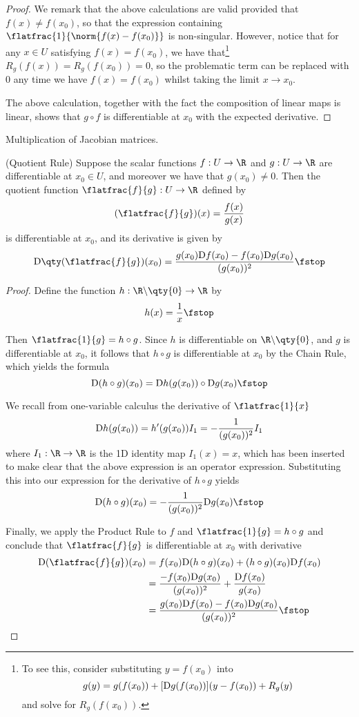 \begin{proof}
  We remark that the above calculations are valid provided that \( f(x)\neq f(x_0) \), so that the expression containing \( \flatfrac{1}{\norm{f(x)-f(x_0)}} \) is non-singular. However, notice that for any \( x\in U \) satisfying \( f(x)=f(x_0) \), we have that\footnote{To see this, consider substituting \( y=f(x_0) \) into \[ g(y)=g(f(x_0))+[\text{D} g(f(x_0))](y-f(x_0))+R_g(y) \] and solve for \( R_g(f(x_0)) \).} \( R_g(f(x))=R_g(f(x_0))=0 \), so the problematic term can be replaced with 0 any time we have \( f(x)=f(x_0) \) whilst taking the limit \( x\to x_0 \).

  \vspace{3mm}

  The above calculation, together with the fact the composition of linear maps is linear, shows that \( g\circ f \) is differentiable at \( x_0 \) with the expected derivative.
\end{proof}

Multiplication of Jacobian matrices.

\begin{theorem}
  (Quotient Rule) Suppose the scalar functions \( f:U\to\R \) and \( g:U\to\R \) are differentiable at \( x_0\in U \), and moreover we have that \( g(x_0)\neq 0 \). Then the quotient function \( \flatfrac{f}{g}:U\to\R \) defined by
  \[ (\flatfrac{f}{g})(x)=\frac{f(x)}{g(x)} \]
  is differentiable at \( x_0 \), and its derivative is given by
  \[ \D\qty(\flatfrac{f}{g})(x_0)=\frac{g(x_0)\D f(x_0)-f(x_0)\D g(x_0)}{(g(x_0))^2}\fstop \]
\end{theorem}
\begin{proof}
  Define the function \( h:\R\backslash\qty{0}\to\R \) by
  \[ h(x)=\frac{1}{x}\fstop \]

  Then \( \flatfrac{1}{g}=h\circ g \). Since \( h \) is differentiable on \( \R\backslash\qty{0} \), and \( g \) is differentiable at \( x_0 \), it follows that \( h\circ g \) is differentiable at \( x_0 \) by the Chain Rule, which yields the formula
  \[ \D(h\circ g)(x_0)=\D h(g(x_0))\circ\D g(x_0)\fstop \]

  We recall from one-variable calculus the derivative of \( \flatfrac{1}{x} \)
  \[ \text{D} h(g(x_0))=h'(g(x_0))I_1=-\frac{1}{(g(x_0))^2}I_1 \]
  where \( I_1:\R\to\R \) is the 1D identity map \( I_1(x)=x \), which has been inserted to make clear that the above expression is an operator expression. Substituting this into our expression for the derivative of \( h\circ g \) yields
  \[ \D(h\circ g)(x_0)=-\frac{1}{(g(x_0))^2}\D g(x_0)\fstop\]

  Finally, we apply the Product Rule to \( f \) and \( \flatfrac{1}{g}=h\circ g \) and conclude that \( \flatfrac{f}{g} \) is differentiable at \( x_0 \) with derivative
  \begin{align*}
    \D(\flatfrac{f}{g})(x_0)&= f(x_0)\D(h\circ g)(x_0)+(h\circ g)(x_0)\D f(x_0)\\
    &= \frac{-f(x_0)\D g(x_0)}{(g(x_0))^2}+\frac{\D f(x_0)}{g(x_0)}\\
    &= \frac{g(x_0)\D f(x_0)-f(x_0)\D g(x_0)}{(g(x_0))^2}\fstop
  \end{align*}
\end{proof}

